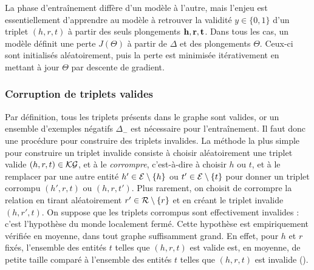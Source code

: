 La phase d'entraînement diffère d'un modèle à l'autre, mais l'enjeu est essentiellement d'apprendre au modèle à retrouver la validité $y \in \{ 0, 1\}$ d'un triplet $(h, r, t)$ à partir des seuls plongements $\bf{h, r, t}$. Dans tous les cas, un modèle définit une perte $J(\Theta)$ à partir de $\Delta$ et des plongements $\Theta$. Ceux-ci sont initialisés aléatoirement, puis la perte est minimisée itérativement en mettant à jour $\Theta$ par descente de gradient.


\subsubsection{Corruption de triplets valides}
\label{subsec:kge-data-corruption}

Par définition, tous les triplets présents dans le graphe sont valides, or un ensemble d'exemples négatifs $\Delta_-$ est nécessaire pour l'entraînement. Il faut donc une procédure pour construire des triplets invalides. La méthode la plus simple pour construire un triplet invalide consiste à choisir aléatoirement une triplet valide $(h, r, t) \in \KG$, et à le \textit{corrompre}, c'est-à-dire à choisir $h$ ou $t$, et à le remplacer par une autre entité $h' \in \Ent \setminus \{ h \}$ ou $t' \in \Ent \setminus \{ t \}$ pour donner un triplet corrompu $(h', r, t)$ ou $(h, r, t')$. Plus rarement, on choisit de corrompre la relation en tirant aléatoirement $r' \in \Rel \setminus \{ r \}$ et en créant le triplet invalide $(h, r', t)$. On suppose que les triplets corrompus sont effectivement invalides : c'est l'hypothèse du monde localement fermé. Cette hypothèse est empiriquement vérifiée en moyenne, dans tout graphe suffisamment grand. En effet, pour $h$ et $r$ fixés, l'ensemble des entités $t$ telles que $(h, r, t)$ est valide est, en moyenne, de petite taille comparé à l'ensemble des entités $t$ telles que $(h, r, t)$ est invalide ().


